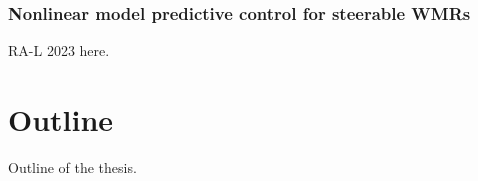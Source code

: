 \subsubsection{Nonlinear model predictive control for steerable WMRs}
RA-L 2023 here.

\section{Outline}
Outline of the thesis.
